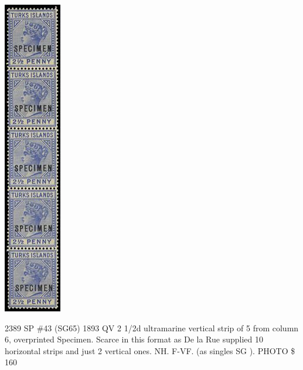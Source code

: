 \begin{marginfigure}
\centering
\rule{0cm}{21.3cm}
\includegraphics[width=.60\textwidth]{../turks-islands/2389.jpg}
\caption{2389
SP
\#43 (SG65) 1893 QV 2 1/2d ultramarine vertical strip of 5 from column 6, 
overprinted Specimen. Scarce in this format as De la Rue supplied 10 
horizontal strips and just 2 vertical ones. NH. F-VF. 
(as singles SG ). 
PHOTO
\$  160 }
\end{marginfigure}

